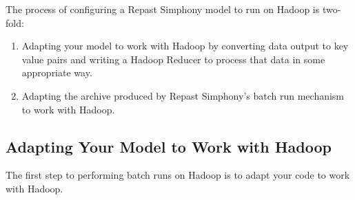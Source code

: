 \documentclass[11pt]{amsart}
\begin{document}
The process of configuring a Repast Simphony model to run on Hadoop is two-fold:
\begin{enumerate}
\item 
Adapting your model to work with Hadoop by converting data output to key value pairs and writing a Hadoop Reducer to process that data in some appropriate way.
\item
Adapting the archive produced by Repast Simphony's batch run mechanism to work with Hadoop.
\end{enumerate}

\subsection{Adapting Your Model to Work with Hadoop}
The first step to performing batch runs on Hadoop is to adapt your code to work with Hadoop.
\end{document}
